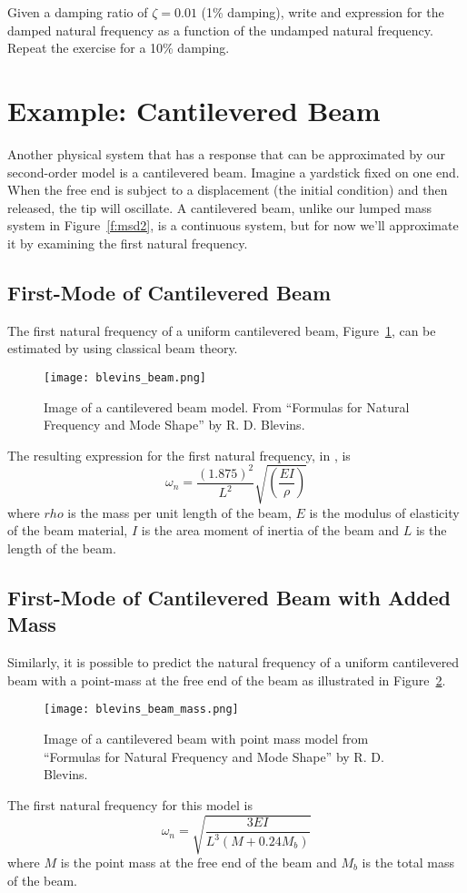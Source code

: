 \begin{ex}
Given a damping ratio of $\zeta=0.01$ (1\% damping), write and expression for the damped natural frequency as a function of the undamped natural frequency.  \\
Repeat the exercise for a 10\% damping.
\end{ex}

\section{Example: Cantilevered Beam}
Another physical system that has a response that can be approximated by our second-order model is a cantilevered beam.  Imagine a yardstick fixed on one end.  When the free end is subject to a displacement (the initial condition) and then released, the tip will oscillate.  A cantilevered beam, unlike our lumped mass system in Figure~\ref{f:msd2}, is a continuous system, but for now we'll approximate it by examining the first natural frequency.  

\subsection{First-Mode of Cantilevered Beam}
The first natural frequency of a uniform cantilevered beam, Figure~\ref{f:blevins}, can be estimated by using classical beam theory.
\begin{figure}[htb!]
\centerline{
{\texttt{[image: blevins\_beam.png]}}}
\caption{Image of a cantilevered beam model.  From ``Formulas for Natural Frequency and Mode Shape'' by R. D. Blevins.}
\label{f:blevins}
\end{figure}
The resulting expression for the first natural frequency, in , is
\begin{equation}\label{e:blevins}
\omega_n = \frac{(1.875)^2}{L^2} \sqrt{\left( \frac{EI}{\rho} \right)}
\end{equation}
where $rho$ is the mass per unit length of the beam, $E$ is the modulus of elasticity of the beam material, $I$ is the area moment of inertia of the beam and $L$ is the length of the beam. 

\subsection{First-Mode of Cantilevered Beam with Added Mass}
Similarly, it is possible to predict the natural frequency of a uniform cantilevered beam with a point-mass at the free end of the beam as illustrated in Figure~\ref{f:blevinsmass}.
\begin{figure}[htb!]
\centerline{
{\texttt{[image: blevins\_beam\_mass.png]}}}
\caption{Image of a cantilevered beam with point mass model from ``Formulas for Natural Frequency and Mode Shape'' by R. D. Blevins.}
\label{f:blevinsmass}
\end{figure}
The first natural frequency for this model is
\begin{equation}\label{e:blevinsmass}
\omega_n = \sqrt{ \frac{3 E I}{L^3 (M+0.24 M_b)}}
\end{equation}
where $M$ is the point mass at the free end of the beam and $M_b$ is the total mass of the beam.

